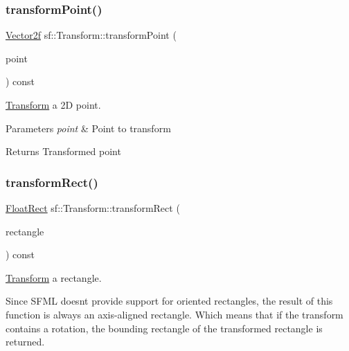 \subsubsection{\texorpdfstring{transformPoint()}{transformPoint()}\hspace{0.1cm}{\footnotesize\ttfamily [2/2]}}
{\footnotesize\ttfamily \mbox{\hyperlink{classsf_1_1_vector2}{Vector2f}} sf\+::\+Transform\+::transform\+Point (\begin{DoxyParamCaption}\item[{const \mbox{\hyperlink{classsf_1_1_vector2}{Vector2f}} \&}]{point }\end{DoxyParamCaption}) const}



\mbox{\hyperlink{classsf_1_1_transform}{Transform}} a 2D point. 


\begin{DoxyParams}{Parameters}
{\em point} & Point to transform\\
\hline
\end{DoxyParams}
\begin{DoxyReturn}{Returns}
Transformed point \begin{DoxyVerb}\end{DoxyVerb}
 
\end{DoxyReturn}
\mbox{\label{classsf_1_1_transform_a3824a20505d81a94bc22be1ffee57d3d}} 
\subsubsection{\texorpdfstring{transformRect()}{transformRect()}}
{\footnotesize\ttfamily \mbox{\hyperlink{classsf_1_1_rect}{Float\+Rect}} sf\+::\+Transform\+::transform\+Rect (\begin{DoxyParamCaption}\item[{const \mbox{\hyperlink{classsf_1_1_rect}{Float\+Rect}} \&}]{rectangle }\end{DoxyParamCaption}) const}



\mbox{\hyperlink{classsf_1_1_transform}{Transform}} a rectangle. 

Since S\+F\+ML doesn\textquotesingle{}t provide support for oriented rectangles, the result of this function is always an axis-\/aligned rectangle. Which means that if the transform contains a rotation, the bounding rectangle of the transformed rectangle is returned.


